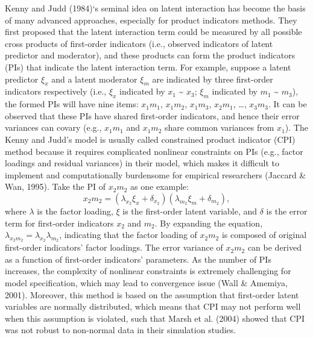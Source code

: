 \documentclass[
  man]{apa7}
\begin{document}
Kenny and Judd (1984)`s seminal idea on latent interaction has become the basis of many advanced approaches, especially for product indicators methods. They first proposed that the latent interaction term could be measured by all possible cross products of first-order indicators (i.e., observed indicators of latent predictor and moderator), and these products can form the product indicators (PIs) that indicate the latent interaction term. For example, suppose a latent predictor \(\xi_{x}\) and a latent moderator \(\xi_{m}\) are indicated by three first-order indicators respectively (i.e., \(\xi_{x}\) indicated by \(x_{1}\) \textasciitilde{} \(x_{3}\); \(\xi_{m}\) indicated by \(m_{1}\) \textasciitilde{} \(m_{3}\)), the formed PIs will have nine items: \(x_{1}m_{1}\), \(x_{1}m_{2}\), \(x_{1}m_{3}\), \(x_{2}m_{1}\), \ldots, \(x_{3}m_{3}\). It can be observed that these PIs have shared first-order indicators, and hence their error variances can covary (e.g., \(x_{1}m_{1}\) and \(x_{1}m_{2}\) share common variances from \(x_{1}\)). The Kenny and Judd's model is usually called constrained product indicator (CPI) method because it requires complicated nonlinear constraints on PIs (e.g., factor loadings and residual variances) in their model, which makes it difficult to implement and computationally burdensome for empirical researchers (Jaccard \& Wan, 1995). Take the PI of \(x_{2}m_{2}\) as one example:
\begin{equation}
x_{2}m_{2}= (\lambda_{x_{2}}\xi_{x} + \delta_{x_{2}})(\lambda_{m_{2}}\xi_{m} + \delta_{m_{2}}),
\end{equation}
where \(\lambda\) is the factor loading, \(\xi\) is the first-order latent variable, and \(\delta\) is the error term for first-order indicators \(x_{2}\) and \(m_{2}\). By expanding the equation, \(\lambda_{x_{2}m_{2}} = \lambda_{x_{2}}\lambda_{m_{2}}\), indicating that the factor loading of \(x_{2}m_{2}\) is composed of original first-order indicators' factor loadings. The error variance of \(x_{2}m_{2}\) can be derived as a function of first-order indicators' parameters. As the number of PIs increases, the complexity of nonlinear constraints is extremely challenging for model specification, which may lead to convergence issue (Wall \& Amemiya, 2001). Moreover, this method is based on the assumption that first-order latent variables are normally distributed, which means that CPI may not perform well when this assumption is violated, such that Marsh et al. (2004) showed that CPI was not robust to non-normal data in their simulation studies.
\end{document}
